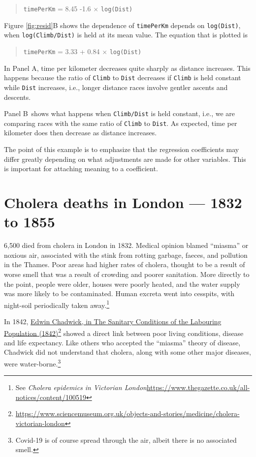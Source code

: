 \documentclass[
  10pt,
  b5paper]{book}
\begin{document}
\begin{quote}
\texttt{timePerKm} = 8.45 -1.6 \(\times\) \texttt{log(Dist)}
\end{quote}

Figure \ref{fig:resid}B shows the dependence of
\texttt{timePerKm} depends on \texttt{log(Dist)}, when \texttt{log(Climb/Dist)}
is held at its mean value. The equation that is plotted is

\begin{quote}
\texttt{timePerKm} = 3.33 + 0.84 \(\times\) \texttt{log(Dist)}
\end{quote}

In Panel A, time per kilometer decreases quite sharply as distance
increases. This happens because the ratio of \texttt{Climb} to \texttt{Dist}
decreases if \texttt{Climb} is held constant while \texttt{Dist} increases,
i.e., longer distance races involve gentler ascents and descents.

Panel B~shows what happens when \texttt{Climb/Dist} is held
constant, i.e., we are comparing races with the same ratio of
\texttt{Climb} to \texttt{Dist}. As expected, time per kilometer does then
decrease as distance increases.

The point of this example is to emphasize that the regression
coefficients may differ greatly depending on what adjustments
are made for other variables. This is important for attaching
meaning to a coefficient.

\hypertarget{cholera-deaths-in-london-1832-to-1855}{%
\section{Cholera deaths in London --- 1832 to 1855}\label{cholera-deaths-in-london-1832-to-1855}}

6,500 died from cholera in London in 1832. Medical opinion
blamed ``miasma'' or noxious air, associated with the stink
from rotting garbage, faeces, and pollution in the Thames.
Poor areas had higher rates of cholera, thought to be
a result of worse smell that was a result of crowding and
poorer sanitation. More directly to the point, people
were older, houses were poorly heated, and the water
supply was more likely to be contaminated. Human excreta
went into cesspits, with night-soil periodically taken
away.\footnote{See \emph{Cholera epidemics in Victorian London}\newline \url{https://www.thegazette.co.uk/all-notices/content/100519}}

In 1842, \href{https://www.sciencemuseum.org.uk/objects-and-stories/medicine/cholera-victorian-london}{Edwin Chadwick, in The Sanitary Conditions of the Labouring Population (1842)}\footnote{\url{https://www.sciencemuseum.org.uk/objects-and-stories/medicine/cholera-victorian-london}}
showed a direct link between poor living conditions,
disease and life expectancy. Like others who accepted
the ``miasma'' theory of disease, Chadwick did not
understand that cholera, along with some other major
diseases, were water-borne.\footnote{Covid-19 is of course
  spread through the air, albeit there is no associated
  smell.}
\end{document}
